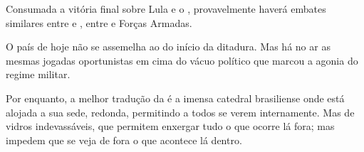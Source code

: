 Consumada a vitória final sobre Lula e o , provavelmente haverá
embates similares entre  e , entre  e Forças Armadas.

O país de hoje não se assemelha ao do início da ditadura. Mas há no ar
as mesmas jogadas oportunistas em cima do vácuo político que marcou a
agonia do regime militar.

Por enquanto, a melhor tradução da  é a imensa catedral brasiliense
onde está alojada a sua sede, redonda, permitindo a todos se verem
internamente. Mas de vidros indevassáveis, que permitem enxergar tudo o
que ocorre lá fora; mas impedem que se veja de fora o que acontece lá
dentro.
